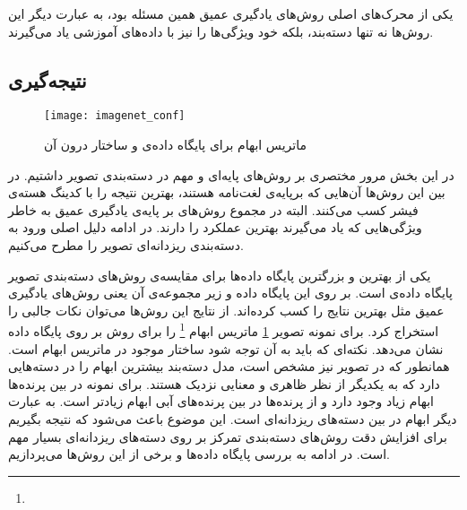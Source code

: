 \documentclass[11pt]{article}
\begin{document}
یکی از محرک‌های اصلی روش‌های یادگیری عمیق همین مسئله بود، به عبارت دیگر این روش‌ها نه تنها دسته‌بند، بلکه خود ویژگی‌ها را نیز با داده‌های آموزشی یاد می‌گیرند.

\subsection{نتیجه‌گیری}\label{sec:img_class:conclusion}
\begin{figure}[t]
	\centering
	\texttt{[image: imagenet\_conf]}
	\caption{ماتریس ابهام برای پایگاه داده‌ی
	 و ساختار درون آن}
	\label{fig:img_class:imagenet_conf}
\end{figure}
در این بخش مرور مختصری بر روش‌های پایه‌ای و مهم در دسته‌بندی تصویر داشتیم. در بین این روش‌ها آن‌هایی که برپایه‌ی لغت‌نامه هستند، بهترین نتیجه را با کدینگ هسته‌ی فیشر کسب می‌کنند. البته در مجموع روش‌های بر پایه‌ی یادگیری عمیق به خاطر ویژگی‌هایی که یاد می‌گیرند بهترین عملکرد را دارند. در ادامه دلیل اصلی ورود به دسته‌بندی ریزدانه‌ای تصویر را مطرح می‌کنیم.

یکی از بهترین و بزرگترین پایگاه داده‌ها برای مقایسه‌ی روش‌های دسته‌بندی تصویر پایگاه داده‌ی
 \cite{imagenet} است.
بر روی این پایگاه داده و زیر مجموعه‌ی آن یعنی
 \cite{ilsvrc}
روش‌های یادگیری عمیق مثل
\cite{alexnet, overfeat, deconv}
بهترین نتایج را کسب کرده‌اند. از نتایج این روش‌ها می‌توان نکات جالبی را استخراج کرد. برای نمونه تصویر
\ref{fig:img_class:imagenet_conf}
ماتریس ابهام
\footnote{}
را برای روش
\cite{deng2010}
بر روی پایگاه داده
نشان می‌دهد. نکته‌ای که باید به آن توجه شود ساختار موجود در ماتریس ابهام است. همانطور که در تصویر نیز مشخص است، مدل دسته‌بند بیشترین ابهام را در دسته‌هایی دارد که به یکدیگر از نظر ظاهری و معنایی نزدیک هستند. برای نمونه در بین پرنده‌ها ابهام زیاد وجود دارد و از پرنده‌ها در بین پرنده‌های آبی ابهام زیادتر است. به عبارت دیگر ابهام در بین دسته‌های ریزدانه‌ای است. این موضوع باعث می‌شود که نتیجه بگیریم برای افزایش دقت روش‌های دسته‌بندی تمرکز بر روی دسته‌های ریزدانه‌ای بسیار مهم است. در ادامه به بررسی پایگاه داده‌ها و برخی از این روش‌ها می‌پردازیم.

\end{document}
